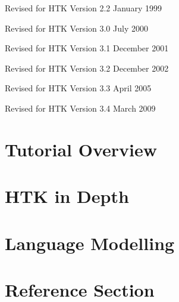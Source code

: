 \documentclass[a4paper,oneside]{book}
\begin{document}
{\noindent Revised for HTK Version 2.2 January 1999 
\vspace{0.05cm}

\noindent Revised for HTK Version 3.0 July 2000 
\vspace{0.05cm}

\noindent Revised for HTK Version 3.1 December 2001
\vspace{0.05cm}

\noindent Revised for HTK Version 3.2 December 2002
\vspace{0.05cm}

\noindent Revised for HTK Version 3.3 April 2005
\vspace{0.05cm}

\noindent Revised for HTK Version 3.4 March 2009
\vspace{0.05cm}

}

\newpage
\tableofcontents

\newpage
\pagestyle{myheadings}

\part{Tutorial Overview}




\part{HTK in Depth}











\part{Language Modelling}




\part{Reference Section}







































   
\clearpage
{}
\printindex
\end{document}
